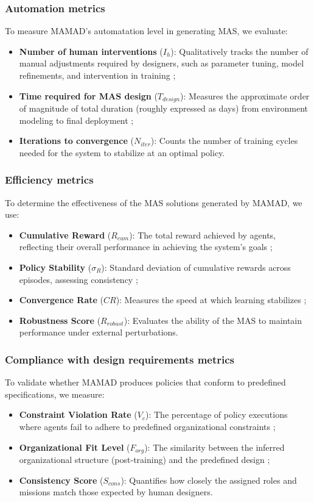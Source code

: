 \documentclass[pdflatex,sn-mathphys-num]{sn-jnl}%
\theoremstyle{thmstyleone}%
\theoremstyle{thmstyletwo}%
\theoremstyle{thmstylethree}%
\begin{document}
\subsubsection{Automation metrics}
To measure MAMAD's automatation level in generating MAS, we evaluate:
\begin{itemize}
    \item \textbf{Number of human interventions} ($I_h$): Qualitatively tracks the number of manual adjustments required by designers, such as parameter tuning, model refinements, and intervention in training ;
    \item \textbf{Time required for MAS design} ($T_{design}$): Measures the approximate order of magnitude of total duration (roughly expressed as days) from environment modeling to final deployment ;
    \item \textbf{Iterations to convergence} ($N_{iter}$): Counts the number of training cycles needed for the system to stabilize at an optimal policy.
\end{itemize}

\subsubsection{Efficiency metrics}
To determine the effectiveness of the MAS solutions generated by MAMAD, we use:
\begin{itemize}
    \item \textbf{Cumulative Reward} ($R_{cum}$): The total reward achieved by agents, reflecting their overall performance in achieving the system's goals ;
    \item \textbf{Policy Stability} ($\sigma_R$): Standard deviation of cumulative rewards across episodes, assessing consistency ;
    \item \textbf{Convergence Rate} ($CR$): Measures the speed at which learning stabilizes ;
    \item \textbf{Robustness Score} ($R_{robust}$): Evaluates the ability of the MAS to maintain performance under external perturbations.
\end{itemize}

\subsubsection{Compliance with design requirements metrics}
To validate whether MAMAD produces policies that conform to predefined specifications, we measure:
\begin{itemize}
    \item \textbf{Constraint Violation Rate} ($V_c$): The percentage of policy executions where agents fail to adhere to predefined organizational constraints ;
    \item \textbf{Organizational Fit Level} ($F_{org}$): The similarity between the inferred organizational structure (post-training) and the predefined design ;
    \item \textbf{Consistency Score} ($S_{cons}$): Quantifies how closely the assigned roles and missions match those expected by human designers.
\end{itemize}
\end{document}
